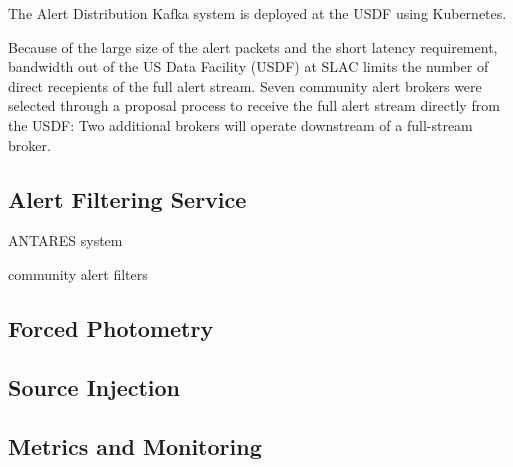 The Alert Distribution Kafka system is deployed at the USDF using Kubernetes.

Because of the large size of the alert packets and the short latency requirement, bandwidth out of the US Data Facility (USDF) at SLAC limits the number of direct recepients of the full alert stream.
Seven community alert brokers were selected through a proposal process  to receive the full alert stream directly from the USDF:
Two additional brokers will operate downstream of a full-stream broker.


\subsection{Alert Filtering Service}

ANTARES system

community alert filters

\subsection{Forced Photometry}

\subsection{Source Injection}

\subsection{Metrics and Monitoring}